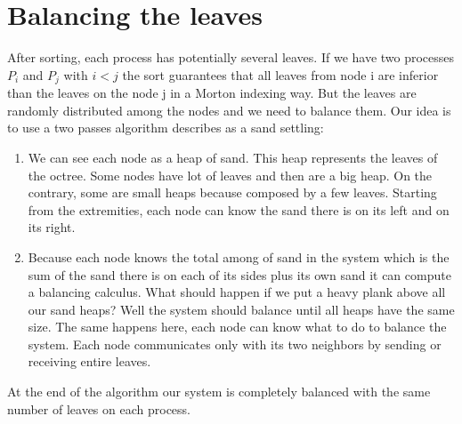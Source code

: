 \documentclass[12pt,letterpaper,titlepage]{report}
\begin{document}
\section{Balancing the leaves}
After sorting, each process has potentially several leaves.
If we have two processes $P_{i}$ and $P_{j}$ with $i < j$ the sort guarantees that all leaves from node i are inferior than the leaves on the node j in a Morton indexing way.
But the leaves are randomly distributed among the nodes and we need to balance them.
Our idea is to use a two passes algorithm describes as a sand settling:
\begin{enumerate}
\item We can see each node as a heap of sand.
This heap represents the leaves of the octree.
Some nodes have lot of leaves and then are a big heap.
On the contrary, some are small heaps because composed by a few leaves.
Starting from the extremities, each node can know the sand there is on its left and on its right.
\item Because each node knows the total among of sand in the system which is the sum of the sand there is on each of its sides plus its own sand it can compute a balancing calculus.
What should happen if we put a heavy plank above all our sand heaps?
Well the system should balance until all heaps have the same size.
The same happens here, each node can know what to do to balance the system.
Each node communicates only with its two neighbors by sending or receiving entire leaves.
\end{enumerate}
At the end of the algorithm our system is completely balanced with the same number of leaves on each process.
\end{document}
